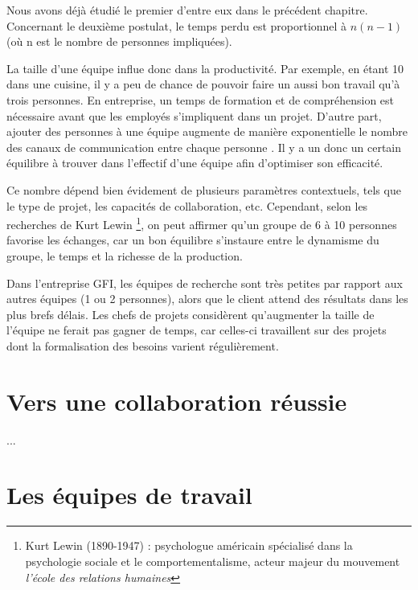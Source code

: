 Nous avons déjà étudié le premier d'entre eux dans le précédent chapitre. Concernant le deuxième postulat, le temps perdu est proportionnel à $ n(n-1) $ (où n est le nombre de personnes impliquées).

La taille d'une équipe influe donc dans la productivité. Par exemple, en étant 10 dans une cuisine, il y a peu de chance de pouvoir faire un aussi bon travail qu'à trois personnes. En entreprise, un temps de formation et de compréhension est nécessaire avant que les employés s'impliquent dans un projet. D'autre part, ajouter des personnes à une équipe augmente de manière exponentielle le nombre des canaux de communication entre chaque personne . Il y a un donc un certain équilibre à trouver dans l'effectif d'une équipe afin d'optimiser son efficacité.

Ce nombre dépend bien évidement de plusieurs paramètres contextuels, tels que le type de projet, les capacités de collaboration, etc. Cependant, selon les recherches de Kurt Lewin \footnote{Kurt Lewin (1890-1947) : psychologue américain spécialisé dans la psychologie sociale et le comportementalisme, acteur majeur du mouvement \textit{l'école des relations humaines}}, on peut affirmer qu'un groupe de 6 à 10 personnes favorise les échanges, car un bon équilibre s'instaure entre le dynamisme du groupe, le temps et la richesse de la production.


\begin{app}
Dans l'entreprise GFI, les équipes de recherche sont très petites par rapport aux autres équipes (1 ou 2 personnes), alors que le client attend des résultats dans les plus brefs délais. Les chefs de projets considèrent qu'augmenter la taille de l'équipe ne ferait pas gagner de temps, car celles-ci travaillent sur des projets dont la formalisation des besoins varient régulièrement.
\end{app}

\section{Vers une collaboration réussie}

...

\section{Les équipes de travail}

